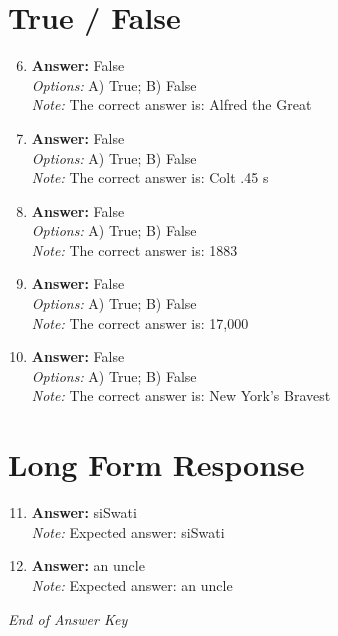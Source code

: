\documentclass[12pt]{article}
\begin{document}
\section*{True / False}
\begin{enumerate}[label=\arabic*.]
\setcounter{enumi}{5}
\item \textbf{Answer:} False
\\ \textit{Options:} A) True; B) False
\\ \textit{Note:} The correct answer is: Alfred the Great
\item \textbf{Answer:} False
\\ \textit{Options:} A) True; B) False
\\ \textit{Note:} The correct answer is: Colt .45 s
\item \textbf{Answer:} False
\\ \textit{Options:} A) True; B) False
\\ \textit{Note:} The correct answer is: 1883
\item \textbf{Answer:} False
\\ \textit{Options:} A) True; B) False
\\ \textit{Note:} The correct answer is: 17,000
\item \textbf{Answer:} False
\\ \textit{Options:} A) True; B) False
\\ \textit{Note:} The correct answer is: New York's Bravest
\end{enumerate}

\section*{Long Form Response}
\begin{enumerate}[label=\arabic*.]
\setcounter{enumi}{10}
\item \textbf{Answer:} siSwati
\\ \textit{Note:} Expected answer: siSwati
\item \textbf{Answer:} an uncle
\\ \textit{Note:} Expected answer: an uncle
\end{enumerate}

\vfill
\noindent\textit{End of Answer Key}
\end{document}
